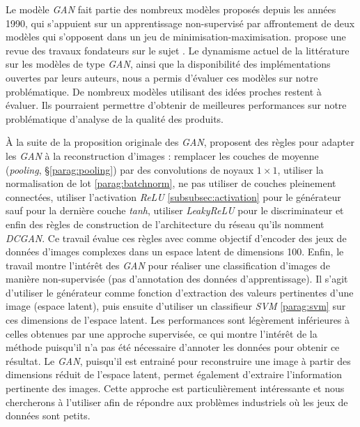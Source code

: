 Le modèle \textit{GAN} fait partie des nombreux modèles proposés depuis les années 1990, qui s'appuient sur un apprentissage non-supervisé par affrontement de deux modèles qui s'opposent dans un jeu de minimisation-maximisation.
\citeauthor{schmidhuber_unsupervised_2019} propose une revue des travaux fondateurs sur le sujet \cite{schmidhuber_unsupervised_2019}.
Le dynamisme actuel de la littérature sur les modèles de type \textit{GAN}, ainsi que la disponibilité des implémentations ouvertes par leurs auteurs, nous a permis d'évaluer ces modèles sur notre problématique.
De nombreux modèles utilisant des idées proches restent à évaluer.
Ils pourraient permettre d'obtenir de meilleures performances sur notre problématique d'analyse de la qualité des produits.

À la suite de la proposition originale des \textit{GAN}, \citeauthor{radford_unsupervised_2015} \cite{radford_unsupervised_2015} proposent des règles pour adapter les \textit{GAN} à la reconstruction d'images : remplacer les couches de moyenne (\textit{pooling}, §\ref{parag:pooling}) par des convolutions de noyaux $1 \times 1$, utiliser la normalisation de lot \ref{parag:batchnorm}, ne pas utiliser de couches pleinement connectées, utiliser l'activation \textit{ReLU} \ref{subsubsec:activation} pour le générateur sauf pour la dernière couche \textit{tanh}, utiliser \textit{LeakyReLU} pour le discriminateur et enfin des règles de construction de l'architecture du réseau qu'ils nomment \textit{DCGAN}.
Ce travail évalue ces règles avec comme objectif d'encoder des jeux de données d'images complexes dans un espace latent de dimensions 100.
Enfin, le travail montre l'intérêt des \textit{GAN} pour réaliser une classification d'images de manière non-supervisée (pas d'annotation des données d'apprentissage).
Il s'agit d'utiliser le générateur comme fonction d'extraction des valeurs pertinentes d'une image (espace latent), puis ensuite d'utiliser un classifieur \textit{SVM} \ref{parag:svm} sur ces dimensions de l'espace latent.
Les performances sont légèrement inférieures à celles obtenues par une approche supervisée, ce qui montre l'intérêt de la méthode puisqu'il n'a pas été nécessaire d'annoter les données pour obtenir ce résultat.
Le \textit{GAN}, puisqu'il est entrainé pour reconstruire une image à partir des dimensions réduit de l'espace latent, permet également d'extraire l'information pertinente des images.
Cette approche est particulièrement intéressante et nous chercherons à l'utiliser afin de répondre aux problèmes industriels où les jeux de données sont petits.

